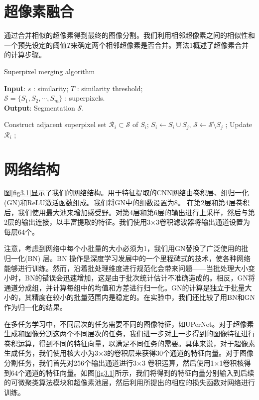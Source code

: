 \section{超像素融合}

通过合并相似的超像素得到最终的图像分割。我们利用相邻超像素之间的相似性和一个预先设定的阈值$T$来确定两个相邻超像素是否合并。算法1概述了超像素合并的计算步骤。
\begin{algorithm}[h]
  \caption{Superpixel merging algorithm}
  \textbf{Input}: $s$ : similarity;
  \hspace*{2em} $T$ : similarity threshold;\\
  \hspace*{2.5em} $\mathcal{S}=\{S_{1}, S_{2},\cdots, S_{m}\}$ : superpixels.\\
  \textbf{Output}: Segmentation $\mathcal{S}$.
  \begin{algorithmic}[1]
    \State Construct adjacent superpixel set $\mathcal{R}_{i}\subset \mathcal{S}$ of $S_i$;
                \State$S_{i} \gets S_{i}\cup S_{j}$, $\mathcal{S} \gets \mathcal{S} \setminus S_{j}$ ;
                \State Update $\mathcal{R}_i$ ;
            \EndIf
        \EndFor
    \EndFor
    \label{algorithm1}
  \end{algorithmic}
\end{algorithm}

\section{网络结构}

图\ref{fig3.1}显示了我们的网络结构。用于特征提取的CNN网络由卷积层、组归一化(GN)和ReLU激活函数组成。我们将GN中的组数设置为8。 在第2层和第4层卷积后，我们使用最大池来增加感受野。对第4层和第6层的输出进行上采样，然后与第2层的输出连接，以丰富提取的特征。我们使用3$\times $3卷积滤波器将输出通道设置为每层64个。

注意，考虑到网络中每个小批量的大小必须为1，我们用GN替换了广泛使用的批归一化(BN) 层。BN 操作是深度学习发展中的一个里程碑式的技术，使各种网络能够进行训练。然而，沿着批处理维度进行规范化会带来问题——当批处理大小变小时，BN的错误会迅速增加，这是由于批次统计估计不准确造成的。相反，GN将通道分成组，并计算每组中的均值和方差进行归一化。GN的计算是独立于批量大小的，其精度在较小的批量范围内是稳定的。在实验中，我们还比较了用BN和GN作为归一化的结果。

在多任务学习中，不同层次的任务需要不同的图像特征，如UPerNet\cite{xiao2018unified}。对于超像素生成和图像分割这两个不同层次的任务，我们进一步对上一步得到的图像特征进行卷积运算，得到不同的特征向量，以满足不同任务的需要。具体来说，对于超像素生成任务，我们使用核大小为3$\times $3的卷积层来获得30个通道的特征向量。对于图像分割任务，我们首先对256个输出通道进行3$\times $3 卷积运算，然后使用1$\times $1卷积核得到64个通道的特征向量。如图\ref{fig3.1}所示，我们将得到的特征向量分别输入到后续的可微聚类算法模块和超像素池层，然后利用所提出的相应的损失函数对网络进行训练。

